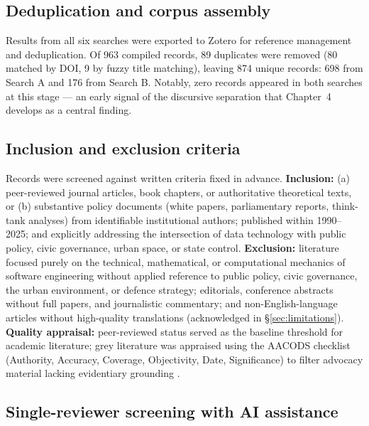 \subsection{Deduplication and corpus assembly}

Results from all six searches were exported to Zotero for reference management and deduplication. Of 963 compiled records, 89 duplicates were removed (80 matched by DOI, 9 by fuzzy title matching), leaving 874 unique records: 698 from Search A and 176 from Search B. Notably, zero records appeared in both searches at this stage — an early signal of the discursive separation that Chapter~4 develops as a central finding.

\subsection{Inclusion and exclusion criteria}

Records were screened against written criteria fixed in advance. \textbf{Inclusion:} (a) peer-reviewed journal articles, book chapters, or authoritative theoretical texts, or (b) substantive policy documents (white papers, parliamentary reports, think-tank analyses) from identifiable institutional authors; published within 1990–2025; and explicitly addressing the intersection of data technology with public policy, civic governance, urban space, or state control. \textbf{Exclusion:} literature focused purely on the technical, mathematical, or computational mechanics of software engineering without applied reference to public policy, civic governance, the urban environment, or defence strategy; editorials, conference abstracts without full papers, and journalistic commentary; and non-English-language articles without high-quality translations (acknowledged in §\ref{sec:limitations}). \textbf{Quality appraisal:} peer-reviewed status served as the baseline threshold for academic literature; grey literature was appraised using the AACODS checklist (Authority, Accuracy, Coverage, Objectivity, Date, Significance) to filter advocacy material lacking evidentiary grounding \parencite{tyndall2010}.

\subsection{Single-reviewer screening with AI assistance}
\label{sec:ai-screening}

